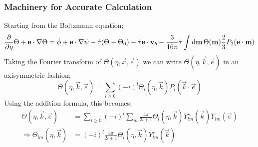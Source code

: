 \subsubsection{Machinery for Accurate Calculation} 
Starting from the Boltzmann equation;
\begin{dmath*}
\frac{\del}{\del \eta}\Theta + \vec{e}\cdot\nabla \Theta = \dot{\phi} + \vec{e}\cdot \nabla\psi + \dot{\tau} (\Theta - \Theta_0) - \dot{\tau}\vec{e}\cdot \vec{v}_b - \frac{3}{16\pi}\dot{\tau}\int{\upd{\vec{m}}\Theta(\vec{m})\frac{2}{3}P_2(\vec{e}\cdot\vec{m})}
\end{dmath*}
Taking the Fourier transform of $\Theta(\eta, \vec{x}, \vec{e})$ we can write $\Theta(\eta, \vec{k}, \vec{e})$ in an axisymmetric fashion;
\begin{equation*}
\Theta(\eta, \vec{k}, \vec{e}) = \sum_{l \geq 0}{(-i)^{l}\Theta_l(\eta, \vec{k})P_l(\vec{k}\cdot\vec{e})}
\end{equation*}
Using the addition formula, this becomes;
\begin{align*}
\Theta(\eta, \vec{k}, \vec{e}) &= \sum_{l \geq 0}{(-i)^{l}\sum_{m}{\frac{4\pi}{2l + 1}\Theta_l(\eta, \vec{k})Y_{lm}^{\star}(\vec{k})Y_{lm}(\vec{e})}} \\
\Rightarrow \Theta_{lm}(\eta, \vec{k}) &= (-i)^{l}\frac{4\pi}{2l + 1}\Theta_l(\eta, \vec{k})Y_{lm}^{\star}(\vec{k})
\end{align*}
